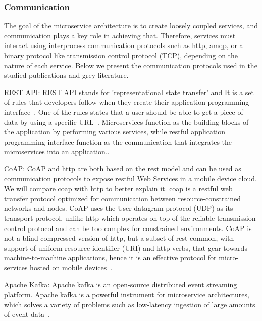 \subsubsection{Communication}

The goal of the microservice architecture is to create loosely coupled services, and communication plays a key role in achieving that. Therefore, services must interact using interprocess communication protocols such as http, amqp, or a binary protocol like transmission control protocol (TCP), depending on the nature of each service. Below we present the communication protocols used in the studied publications and grey literature.

\par REST API: REST API stands for 'representational state transfer' and It is a set of rules that developers follow when they create their application programming interface~\cite{Ndungu2019, Zhang2019}. One of the rules states that a user should be able to get a piece of data by using a specific URL~\cite{Koschel2017, Branko2018}. Microservices function as the building blocks of the application by performing various services, while restful application programming interface function as the communication that integrates the microservices into an application.\cite{liu2018, Zaytev2018, chauvel2018, Johansson2019}.

\par CoAP: CoAP and http are both based on the rest model and can be used as communication protocols to expose restful Web Services in a mobile device cloud. We will compare coap with http to better explain it. coap is a restful web transfer protocol optimized for communication between resource-constrained networks and nodes. CoAP uses the User datagram protocol (UDP) as its transport protocol, unlike http which operates on top of the reliable transmission control protocol and can be too complex for constrained environments. CoAP is not a blind compressed version of http, but a subset of rest common, with support of uniform resource identifier (URI) and http verbs, that gear towards machine-to-machine applications, hence it is an effective protocol for micro-services hosted on mobile devices~\cite{liu2018, khan2017}.

\par Apache Kafka: Apache kafka is an open-source distributed event streaming platform. Apache kafka is a powerful instrument for microservice architectures, which solves a variety of problems such as low-latency ingestion of large amounts of event data~\cite{wang2020, ebay}.

